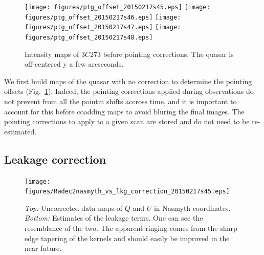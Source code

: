 \documentclass[a4paper,10pt]{article}
\begin{document}
\begin{figure}
\begin{center}
\texttt{[image: figures/ptg\_offset\_20150217s45.eps]}
\texttt{[image: figures/ptg\_offset\_20150217s46.eps]}
\texttt{[image: figures/ptg\_offset\_20150217s47.eps]}
\texttt{[image: figures/ptg\_offset\_20150217s48.eps]}
\caption{Intensity maps of $3C273$ before pointing corrections. The quasar is
  off-centered y a few arcseconds.}
\label{fig:ptg_offsets}
\end{center}
\end{figure}

We first build maps of the quasar with no correction to determine the pointing
offsets (Fig.~\ref{fig:ptg_offsets}). Indeed, the pointing corrections applied during observations do not
prevent from all the pointin shifts accross time, and it is important to account
for this before coadding maps to avoid bluring the final images. The pointing
corrections to apply to a given scan are stored and do not need to be
re-estimated.

\subsection{Leakage correction}

\begin{figure}
\begin{center}
\texttt{[image: figures/Radec2nasmyth\_vs\_lkg\_correction\_20150217s45.eps]}
\caption{\emph{Top:} Uncorrected data maps of $Q$ and $U$ in Nasmyth
  coordinates. \emph{Bottom:} Estimates of the leakage terms. One can see the
  resemblance of the two. The apparent ringing comes from the sharp edge
  tapering of the kernels and should easily be improved in the near future.}
\label{fig:data_vs_lkg}
\end{center}
\end{figure}
\end{document}
